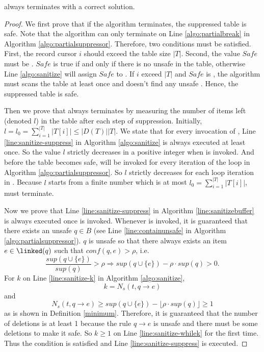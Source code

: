 \begin{theorem}
\label{CorrectnessOfPartialSuppressor}
  \PartialSuppressor always terminates with a correct solution.
\end{theorem}
\begin{proof}
We first prove that if the algorithm terminates, the suppressed table is safe.
Note that the algorithm can only terminate on Line \ref{algo:partialbreak}
  in Algorithm \ref{algo:partialsuppressor}.
  Therefore, two conditions must be satisfied. First, the record cursor
$i$ should exceed the table size $|T|$. Second, the value $Safe$ must be \TRUE.
$Safe$ is true if and only if there is no unsafe \qids in the table, otherwise  Line \ref{algo:sanitize}
 will assign $Safe$ to \FALSE. If $i$ exceed $|T|$ and $Safe$ is \TRUE, the algorithm
must scans the table at least once and doesn't find any unsafe \qids. Hence, the
 suppressed table is safe.


Then we prove that \PartialSuppressor always terminates by measuring the
  number of items left (denoted $l$) in the table after each step of suppression.
Initially, $l=l_0=\sum_{i=1}^{|T|} |T[i]|\le |D(T)| |T|$.
We state that for every invocation of \SanitizeBuffer, Line \ref{line:sanitize-suppress}
  in Algorithm \ref{algo:sanitize} is always executed at least once.
So the value $l$ strictly decreases in a positive integer
when \SanitizeBuffer is invoked.
And before the table becomes safe, \SanitizeBuffer will be invoked for
  every iteration of the loop in Algorithm \ref{algo:partialsuppressor}.
So $l$ strictly decreases for each loop iteration in \PartialSuppressor.
Because $l$ starts from a finite number which is at most $l_0=\sum_{i=1}^{|T|} |T[i]|$,
  \PartialSuppressor must terminate.

Now we prove that Line \ref{line:sanitize-suppress} in Algorithm \ref{line:sanitizebuffer}
  is always executed once \SanitizeBuffer is invoked.
Whenever \SanitizeBuffer is invoked, it is guaranteed that there exists
  an unsafe \qid $q\in B$ (see Line \ref{line:containunsafe}  in Algorithm \ref{algo:partialsuppressor}).
$q$ is unsafe so that there always exists an item $e\in\linked(q)$ such that $conf(q,e)>\rho$,
  i.e. \[ \frac{sup(q\cup\{e\})}{sup(q)}>\rho \Rightarrow
   sup(q\cup\{e\})-\rho\cdot sup(q)>0 .\]
For $k$ on Line \ref{line:sanitize-k} in Algorithm \ref{algo:sanitize},
  \[ k = N_s(t, q\rightarrow e)\]
  and
  \[N_s(t, q\rightarrow e) \geq sup(q\cup\{e\})-\lfloor\rho\cdot sup(q)\rfloor \ge 1\]
  as is shown in Definition \ref{minimum}. Therefore,
  it is guaranteed that the number of deletions is at least 1
  because the rule $q\rightarrow e$ is unsafe and there must be some deletions to make it safe.
So $k\ge 1$ on Line \ref{line:sanitize-whilek} for the first time.
Thus the condition is satisfied and Line \ref{line:sanitize-suppress} is executed.
\end{proof}

